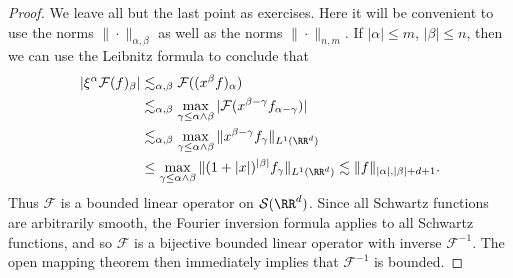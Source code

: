\begin{proof}

    We leave all but the last point as exercises. Here it will be convenient to use the norms $\| \cdot \|_{\alpha,\beta}$ as well as the norms $\| \cdot \|_{n,m}$. If $|\alpha| \leq m$, $|\beta| \leq n$, then we can use the Leibnitz formula to conclude that
    \begin{align*}
        |\xi^\alpha \mathcal{F}(f)_\beta| &\lesssim_{\alpha,\beta} \mathcal{F}((x^\beta f)_\alpha)\\
        &\lesssim_{\alpha,\beta} \max_{\gamma \leq \alpha \wedge \beta} |\mathcal{F}(x^{\beta - \gamma} f_{\alpha - \gamma})|\\
        &\lesssim_{\alpha,\beta} \max_{\gamma \leq \alpha \wedge \beta} \| x^{\beta - \gamma} f_\gamma \|_{L^1(\RR^d)}\\
        &\leq \max_{\gamma \leq \alpha \wedge \beta} \| (1 + |x|)^{|\beta|} f_\gamma \|_{L^1(\RR^d)} \lesssim \| f \|_{|\alpha|,|\beta|+d+1}.
    \end{align*}
    Thus $\mathcal{F}$ is a bounded linear operator on $\mathcal{S}(\RR^d)$. Since all Schwartz functions are arbitrarily smooth, the Fourier inversion formula applies to all Schwartz functions, and so $\mathcal{F}$ is a bijective bounded linear operator with inverse $\mathcal{F}^{-1}$. The open mapping theorem then immediately implies that $\mathcal{F}^{-1}$ is bounded.
\end{proof}

